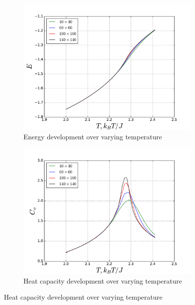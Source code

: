 \documentclass[a4paper]{article}
\begin{document}
\begin{figure}[h!] 
  \begin{subfigure}[b]{0.5\linewidth}
    \centering
    \includegraphics[width=1.0\linewidth]{phase_10_6_energy} 
    \caption{Energy development over varying temperature } 
    \label{fig3:a} 
    \vspace{1ex}
  \end{subfigure}
  \begin{subfigure}[b]{0.5\linewidth}
    \centering
    \includegraphics[width=1.0\linewidth]{phase_10_6_heat_capacity} 
    \caption{Heat capacity development over varying temperature } 
    \label{fig3:b} 
    \vspace{1ex}
  \end{subfigure} 

\end{figure}
\end{document}
